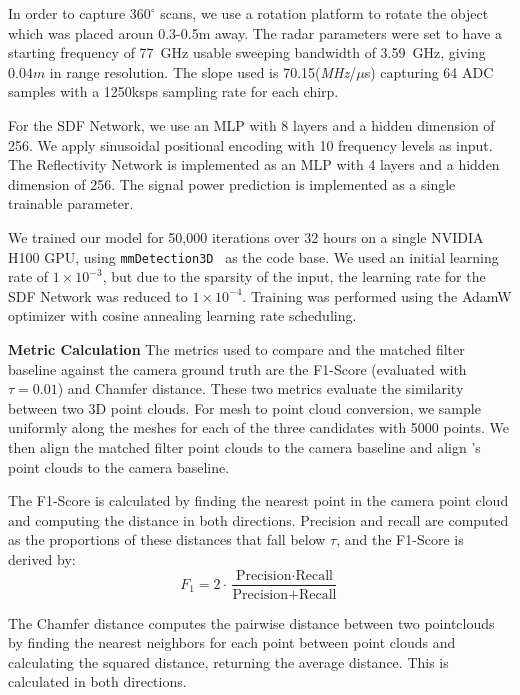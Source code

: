 In order to capture $360^{\circ}$ scans, we use a rotation platform to rotate the object which was placed aroun 0.3-0.5m away. The radar parameters were set to have a starting frequency of 77~GHz usable sweeping bandwidth of 3.59~GHz, giving $0.04m$ in range resolution. The slope used is 70.15(\textit{MHz}/$\mu$s) capturing 64 ADC samples with a 1250ksps sampling rate for each chirp.

For the SDF Network, we use an MLP with 8 layers and a hidden dimension of 256.  
We apply sinusoidal positional encoding with 10 frequency levels as input.  
The Reflectivity Network is implemented as an MLP with 4 layers and a hidden dimension of 256.  
The signal power prediction is implemented as a single trainable parameter.

We trained our model for 50{,}000 iterations over 32 hours on a single NVIDIA H100 GPU, using \texttt{mmDetection3D}~\cite{mmdet3d2020} as the code base.  
We used an initial learning rate of \(1 \times 10^{-3}\), but due to the sparsity of the input, the learning rate for the SDF Network was reduced to \(1 \times 10^{-4}\).  
Training was performed using the AdamW optimizer with cosine annealing learning rate scheduling.

\noindent \textbf{Metric Calculation}
The metrics used to compare \name{} and the matched filter baseline against the camera ground truth are the F1-Score (evaluated with $\tau = 0.01$) and Chamfer distance. These two metrics evaluate the similarity between two 3D point clouds. For mesh to point cloud conversion, we sample uniformly along the meshes for each of the three candidates with 5000 points. We then align the matched filter point clouds to the camera baseline and align \name{}'s point clouds to the camera baseline. 

The F1-Score is calculated by finding the nearest point in the camera point cloud and computing the distance in both directions. Precision and recall are computed as the proportions of these distances that fall below $\tau$, and the F1-Score is derived by:
\begin{equation}
F_1 = 2 \cdot \frac{\text{Precision} \cdot \text{Recall}}{\text{Precision} + \text{Recall}}
\end{equation}

The Chamfer distance computes the pairwise distance between two pointclouds by finding the nearest neighbors for each point between point clouds and calculating the squared distance, returning the average distance. This is calculated in both directions. 

